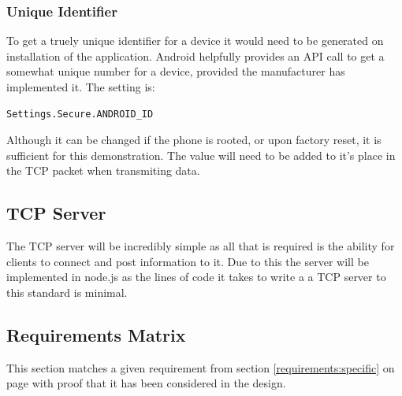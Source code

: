 \subsubsection{Unique Identifier}
\label{unique-android-id}
To get a truely unique identifier for a device it would need to be generated on installation of the application. Android helpfully provides an API call to get a somewhat unique number for a device, provided the manufacturer has implemented it. The setting is: 

\begin{verbatim}
Settings.Secure.ANDROID_ID
\end{verbatim}

Although it can be changed if the phone is rooted, or upon factory reset, it is sufficient for this demonstration. The value will need to be added to it's place in the TCP packet when transmiting data.

\subsection{TCP Server}
\label{nodejs}
The TCP server will be incredibly simple as all that is required is the ability for clients to connect and post information to it. Due to this the server will be implemented in node.js as the lines of code it takes to write a a TCP server to this standard is minimal.

\clearpage
\subsection{Requirements Matrix}
This section matches a given requirement from section \ref{requirements:specific} on page \pageref{requirements:specific} with proof that it has been considered in the design. 
